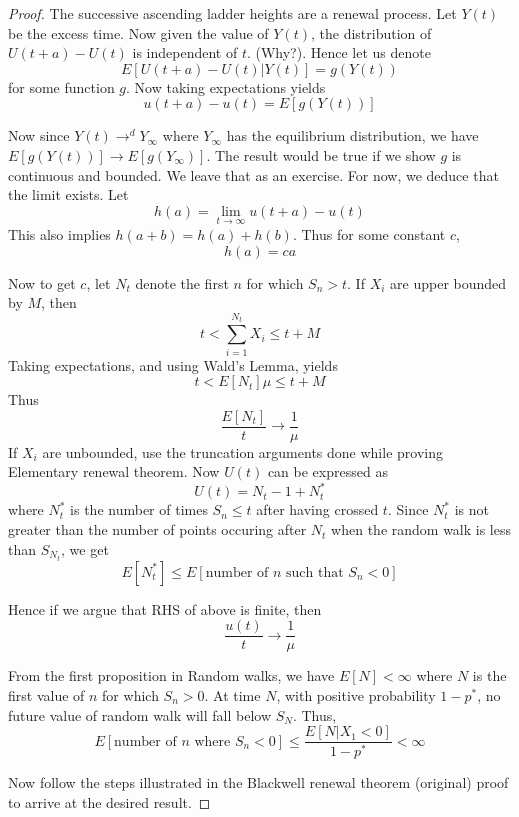 \documentclass[a4paper,10pt]{article}
\theoremstyle{plain}
\theoremstyle{definition}
\theoremstyle{remark}
\begin{document}
\begin{proof}
The successive ascending ladder heights are a renewal process. Let $Y(t)$ be the excess time. Now given the value of $Y(t)$, the distribution of $U(t+a) - U(t)$ is independent of $t$. (Why?). Hence let us denote
\[E[U(t+a) - U(t)|Y(t)] = g(Y(t))\]
for some function $g$. Now taking expectations yields
\[u(t+a) - u(t) = E[g(Y(t))]\]

Now since $Y(t) \to^d Y_\infty$ where $Y_\infty$ has the equilibrium distribution, we have $E[g(Y(t))] \to E[g(Y_\infty)]$. The result would be true if we show $g$ is continuous and bounded. We leave that as an exercise. For now, we deduce that the limit exists. Let
\[h(a) = \lim_{t \to \infty}u(t+a) - u(t)\]
This also implies $h(a+b) = h(a) + h(b)$. Thus for some constant $c$, 
\[h(a) = ca\]

Now to get $c$, let $N_t$ denote the first $n$ for which $S_n > t$. If $X_i$ are upper bounded by $M$, then
\[t < \sum_{i=1}^{N_t} X_i \leq t+M\]
Taking expectations, and using Wald's Lemma, yields
\[t < E[N_t]\mu \leq t+M\]
Thus 
\[\frac{E[N_t]}{t} \to \frac{1}{\mu}\]
If $X_i$ are unbounded, use the truncation arguments done while proving Elementary renewal theorem. Now $U(t)$ can be expressed as
\[U(t) = N_t -1 +N_t^*\]
where $N_t^*$ is the number of times $S_n \leq t$ after having crossed $t$. Since $N_t^*$ is not greater than the number of points occuring after $N_t$ when the random walk is less than $S_{N_t}$, we get
\[E[N_t^*] \leq E[\mbox{number of $n$ such that $S_n < 0$}]\]

Hence if we argue that RHS of above is finite, then
\[\frac{u(t)}{t} \to \frac{1}{\mu}\]

From the first proposition in Random walks, we have $E[N] <\infty$ where $N$ is the first value of $n$ for which $S_n > 0$. At time $N$, with positive probability $1-p^*$, no future value of random walk will fall below $S_N$. Thus,
\[E[\mbox{number of $n$ where $S_n < 0$}] \leq \frac{E[N|X_1<0]}{1-p^*} < \infty\]

Now follow the steps illustrated in the Blackwell renewal theorem (original) proof to arrive at the desired result.

\end{proof}
\end{document}
